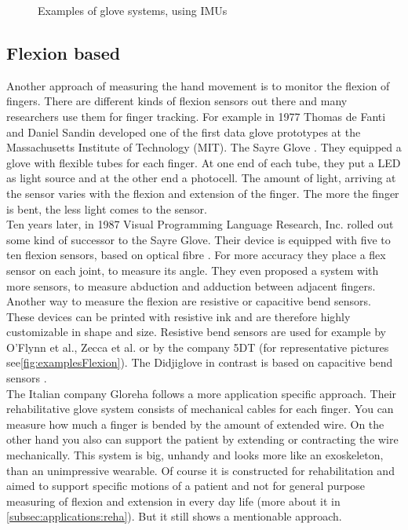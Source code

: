 \begin{figure}[h]
	\hfill
	
	\caption{Examples of glove systems, using IMUs}
	\label{fig:examplesIMU}
\end{figure}

\subsection{Flexion based} \label{subsec:approaches:flexion}
Another approach of measuring the hand movement is to monitor the flexion of fingers. There are different kinds of flexion sensors out there and many researchers use them for finger tracking. For example in 1977 Thomas de Fanti and Daniel Sandin developed one of the first data glove prototypes at the Massachusetts Institute of Technology (MIT). The Sayre Glove  \cite{sturman1994survey}. They equipped a glove with flexible tubes for each finger. At one end of each tube, they put a LED as light source and at the other end a photocell. The amount of light, arriving at the sensor varies with the flexion and extension of the finger. The more the finger is bent, the less light comes to the sensor.\\
Ten years later, in 1987 Visual Programming Language Research, Inc. rolled out some kind of successor to the Sayre Glove. Their device is equipped with five to ten flexion sensors, based on optical fibre \cite{zimmerman1985optical}. For more accuracy they place a flex sensor on each joint, to measure its angle. They even proposed a system with more sensors, to measure abduction and adduction between adjacent fingers.\\
Another way to measure the flexion are resistive or capacitive bend sensors. These devices can be printed with resistive ink and are therefore highly customizable in shape and size. Resistive bend sensors are used for example by O'Flynn et al., Zecca et al. or by the company 5DT (for representative pictures see\ref{fig:examplesFlexion}). The Didjiglove in contrast is based on capacitive bend sensors \cite{sturman1994survey}.\\
The Italian company Gloreha \cite{Gloreha} follows a more application specific approach. Their rehabilitative glove system consists of mechanical cables for each finger. You can measure how much a finger is bended by the amount of extended wire. On the other hand you also can support the patient by extending or contracting the wire mechanically. This system is big, unhandy and looks more like an exoskeleton, than an unimpressive wearable. Of course it is constructed for rehabilitation and aimed to support specific motions of a patient and not for general purpose measuring of flexion and extension in every day life (more about it in \ref{subsec:applications:reha}). But it still shows a mentionable approach.

